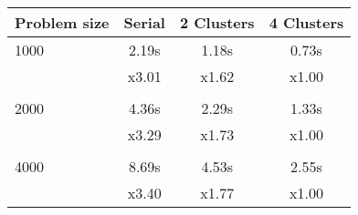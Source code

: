 \centering\begin{tabular}{l*{3}{c}}
\toprule
Problem size & Serial & 2 Clusters & 4 Clusters\\\midrule
1000 &   2.19s &   1.18s &   0.73s \\    
 &  x3.01 &  x1.62 &  x1.00 \\ \\
2000 &   4.36s &   2.29s &   1.33s \\    
 &  x3.29 &  x1.73 &  x1.00 \\ \\
4000 &   8.69s &   4.53s &   2.55s \\    
 &  x3.40 &  x1.77 &  x1.00 \\
\bottomrule
\end{tabular}

